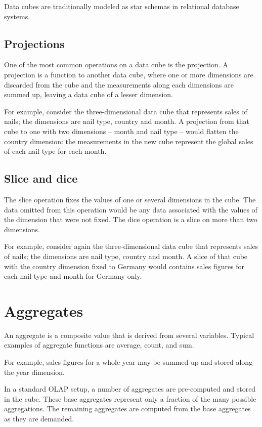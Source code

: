 Data cubes are traditionally modeled as star schemas in relational database
systems. \cite{olap_solutions}


\subsection*{Projections}

One of the most common operations on a data cube is the projection. A
projection is a function to another data cube, where one or more dimensions
are discarded from the cube and the measurements along each dimensions are
summed up, leaving a data cube of a lesser dimension.

For example, consider the three-dimensional data cube that represents sales of
nails; the dimensions are nail type, country and month. A projection from that
cube to one with two dimensions -- month and nail type -- would flatten the
country dimension: the measurements in the new cube represent the global sales
of each nail type for each month.


\subsection*{Slice and dice}

The slice operation fixes the values of one or several dimensions in the cube.
The data omitted from this operation would be any data associated with the
values of the dimension that were not fixed. The dice operation is a slice on
more than two dimensions.

For example, consider again the three-dimensional data cube that represents
sales of nails; the dimensions are nail type, country and month. A slice of
that cube with the country dimension fixed to Germany would contains sales
figures for each nail type and month for Germany only.


\section{Aggregates}

An aggregate is a composite value that is derived from several variables.
Typical examples of aggregate functions are average, count, and sum.

For example, sales figures for a whole year may be summed up and stored along
the year dimension.

In a standard OLAP setup, a number of aggregates are pre-computed and
stored in the cube. These base aggregates represent only a fraction of the
many possible aggregations. The remaining aggregates are computed from the
base aggregates as they are demanded.


